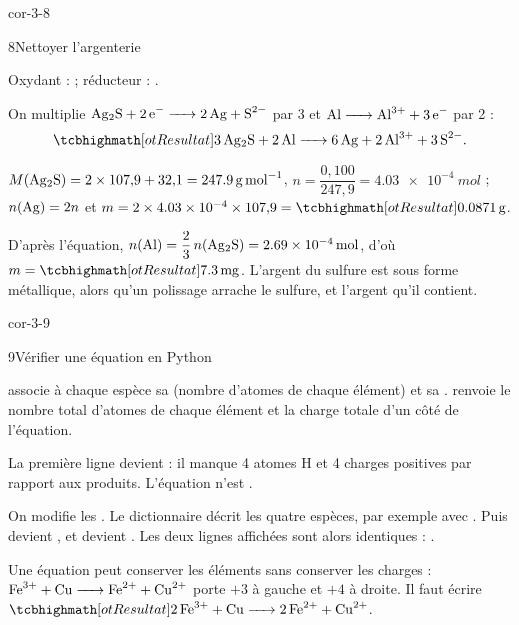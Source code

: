 \begin{blocLivre}{cor-3-8}
\begin{corrige}{8}{Nettoyer l'argenterie}
\begin{questions}
\item Oxydant :  ; réducteur : .
\item On multiplie $\ce{Ag2S + 2e- -> 2Ag + S^{2-}}$ par 3 et $\ce{Al -> Al^{3+} + 3e-}$ par 2 :
\[\res{\ce{3Ag2S + 2Al -> 6Ag + 2Al^{3+} + 3S^{2-}}}.\]
\item $M(\ce{Ag2S})=2\times107{,}9+32{,}1=\qty{247,9}{g.mol^{-1}}$, $n=\dfrac{0{,}100}{247{,}9}=\qty{4,03e-4}{mol}$ ; $n(\ce{Ag})=2n$ et
$m=2\times\num{4.03e-4}\times107{,}9=\res{\qty{0,0871}{g}}$.
\item D'après l'équation, $n(\ce{Al})=\dfrac{2}{3}\,n(\ce{Ag2S})=\qty{2,69e-4}{mol}$, d'où $m=\res{\qty{7,3}{mg}}$. L'argent du sulfure est  sous forme métallique, alors qu'un polissage arrache le sulfure, et l'argent qu'il contient.
\end{questions}
\end{corrige}
\end{blocLivre}
\begin{blocLivre}{cor-3-9}
\begin{corrige}{9}{Vérifier une équation en Python}
\begin{questions}
\item {} associe à chaque espèce sa  (nombre d'atomes de chaque élément) et sa .
 renvoie le nombre total d'atomes de chaque élément et la charge totale d'un côté de l'équation.
\item La première ligne devient  : il manque 4 atomes H et 4 charges
positives par rapport aux produits. L'équation n'est .
\item On modifie les . Le dictionnaire  décrit les quatre espèces, par
exemple avec . Puis  devient , et 
devient . Les deux lignes affichées sont alors identiques : .
\item Une équation peut conserver les éléments sans conserver les charges : $\ce{Fe^{3+} + Cu -> Fe^{2+} + Cu^{2+}}$ porte $+3$ à
gauche et $+4$ à droite. Il faut écrire $\res{\ce{2Fe^{3+} + Cu -> 2Fe^{2+} + Cu^{2+}}}$.
\end{questions}
\end{corrige}
\end{blocLivre}
